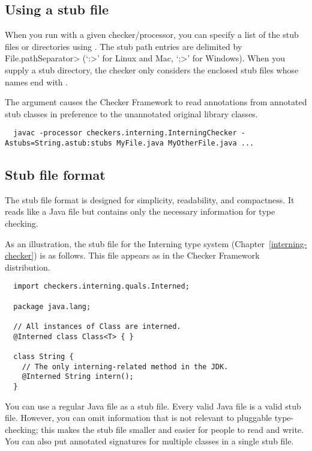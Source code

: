 \subsection{Using a stub file\label{stub-using}}

  When you run  with a given checker/processor, you can specify
  a list of the stub files or directories using
  .  The stub path entries
  are delimited by
  \<File.pathSeparator> (`\<:>' for Linux and Mac, `\<;>' for Windows).
  When you supply a stub directory, the checker only considers the enclosed
  stub files whose names end with .

  The  argument causes the Checker Framework to read annotations
  from annotated stub classes in preference to the unannotated original
  library classes.

\begin{smaller}
\begin{Verbatim}
  javac -processor checkers.interning.InterningChecker -Astubs=String.astub:stubs MyFile.java MyOtherFile.java ...
\end{Verbatim}
\end{smaller}


\subsection{Stub file format\label{stub-format}}

The stub file format is designed for simplicity, readability, and
compactness.  It reads like a Java file but contains only the
necessary information for type checking.

As an illustration, the stub file for the Interning type system
(Chapter~\ref{interning-checker}) is as follows.  This file appears as
 in the Checker Framework
distribution.

\begin{Verbatim}
  import checkers.interning.quals.Interned;

  package java.lang;

  // All instances of Class are interned.
  @Interned class Class<T> { }

  class String {
    // The only interning-related method in the JDK.
    @Interned String intern();
  }
\end{Verbatim}


You can use a regular Java file as a stub file.  Every valid Java file is a
valid stub file.  However, you can omit
information that is not relevant to pluggable type-checking; this makes the
stub file smaller and easier for people to read and write.  You can also
put annotated signatures for multiple classes in a single stub file.



